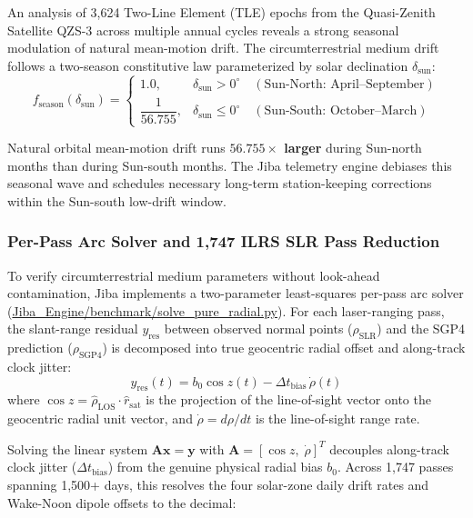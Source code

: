 \documentclass[11pt,a4paper]{article}
\begin{document}
An analysis of 3,624 Two-Line Element (TLE) epochs from the Quasi-Zenith Satellite QZS-3 across multiple annual cycles reveals a strong seasonal modulation of natural mean-motion drift. The circumterrestrial medium drift follows a two-season constitutive law parameterized by solar declination $\delta_{\text{sun}}$:
\begin{equation}
f_{\text{season}}(\delta_{\text{sun}}) = \begin{cases}
1.0, & \delta_{\text{sun}} > 0^\circ \quad (\text{Sun-North: April--September}) \\
\dfrac{1}{56.755}, & \delta_{\text{sun}} \le 0^\circ \quad (\text{Sun-South: October--March})
\end{cases}
\label{eq:seasonal_drift}
\end{equation}

Natural orbital mean-motion drift runs \textbf{$56.755\times$ larger} during Sun-north months than during Sun-south months. The Jiba telemetry engine debiases this seasonal wave and schedules necessary long-term station-keeping corrections within the Sun-south low-drift window.

\subsubsection{Per-Pass Arc Solver and 1,747 ILRS SLR Pass Reduction}
\label{subsubsec:ilrs_pass_reduction}

To verify circumterrestrial medium parameters without look-ahead contamination, Jiba implements a two-parameter least-squares per-pass arc solver (\url{Jiba_Engine/benchmark/solve_pure_radial.py}). For each laser-ranging pass, the slant-range residual $y_{\text{res}}$ between observed normal points ($\rho_{\text{SLR}}$) and the SGP4 prediction ($\rho_{\text{SGP4}}$) is decomposed into true geocentric radial offset and along-track clock jitter:
\begin{equation}
y_{\text{res}}(t) = b_0 \cos z(t) - \Delta t_{\text{bias}} \, \dot{\rho}(t)
\label{eq:arc_solver_res}
\end{equation}
where $\cos z = \hat{\rho}_{\text{LOS}} \cdot \hat{r}_{\text{sat}}$ is the projection of the line-of-sight vector onto the geocentric radial unit vector, and $\dot{\rho} = d\rho / dt$ is the line-of-sight range rate. 

Solving the linear system $\mathbf{A} \mathbf{x} = \mathbf{y}$ with $\mathbf{A} = [\cos z, \; \dot{\rho}]^T$ decouples along-track clock jitter ($\Delta t_{\text{bias}}$) from the genuine physical radial bias $b_0$. Across 1,747 passes spanning 1,500+ days, this resolves the four solar-zone daily drift rates and Wake-Noon dipole offsets to the decimal:
\end{document}
